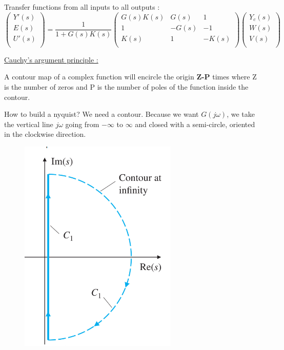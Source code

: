 \documentclass[../main.tex]{subfiles}
\begin{document}
Transfer functions from all inputs to all outputs : \begin{equation}
    \begin{pmatrix}
        Y'(s)\\ E(s) \\ U'(s)\\
    \end{pmatrix} = \frac{1}{1+G(s)K(s)} \begin{pmatrix}
        G(s)K(s) & G(s) & 1\\ 1 & -G(s) & -1\\ K(s) & 1 & -K(s)\\
    \end{pmatrix} \begin{pmatrix}
        Y_c(s)\\ W(s)\\ V(s)\\
    \end{pmatrix}
\end{equation}

\quad \underline{Cauchy's argument principle :}\\
\begin{theorem}
    A contour map of a complex function will encircle the origin \textbf{Z-P} times where Z is the number of zeros and P is the number of poles of the function inside the contour.
\end{theorem}

How to build a nyquist? We need a contour. Because we want $G(j\omega)$, we take the vertical line $j\omega$ going from $-\infty$ to $\infty$ and closed with a semi-circle, oriented in the clockwise direction.\\

\begin{figure}[hbt!]
    \centering
    \includegraphics[width=.4\textwidth]{IMAGES/control/nyquist.png}
\end{figure}
\end{document}
